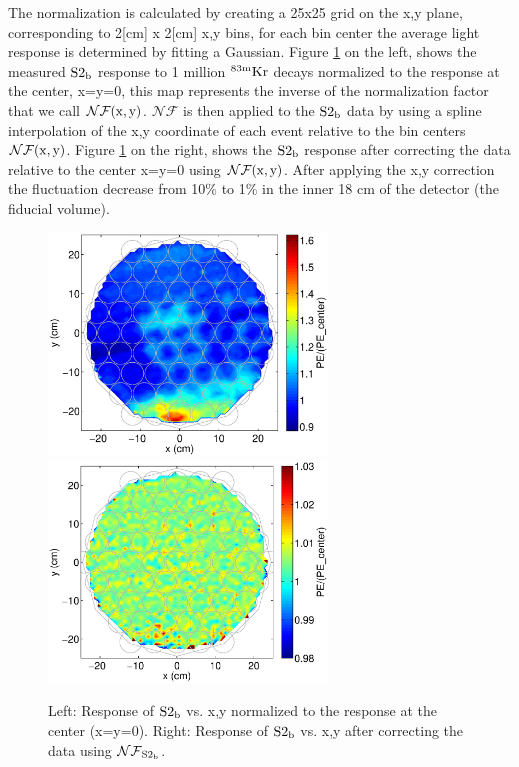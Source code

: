 The normalization is calculated by creating a 25x25 grid on the x,y plane, corresponding to 2[cm] x 2[cm] x,y bins, for each bin center the average light response is determined by fitting a Gaussian. Figure \ref{fig:S2_XY_norm_center} on the left, shows the measured $\rm S2_b$ response to 1 million $\rm^{83m}Kr$ decays normalized to the response at the center, x=y=0, this map represents the inverse of the normalization factor that we call $\rm\mathcal{NF}(x,y)$. $\mathcal{NF}$ is then applied to the $\rm S2_b$ data by using a spline interpolation of the x,y coordinate of each event relative to the bin centers $\rm\mathcal{NF}(x,y)$. Figure \ref{fig:S2_XY_norm_center} on the right, shows the $\rm S2_b$ response after correcting the data relative to the center x=y=0 using $\rm\mathcal{NF}(x,y)$. After applying the x,y correction the fluctuation decrease from 10\% to 1\% in the inner 18 cm of the detector (the fiducial volume).


\begin{figure}[h!]\centering
\includegraphics[width=74mm]{Chapter_XYZ_Corr/Thesis_Corr_Plots/S2_b_1cm_1cm/S2_b_XY_1cm_norm.eps}
\includegraphics[width=74mm]{Chapter_XYZ_Corr/Thesis_Corr_Plots/S2_b_1cm_1cm/S2_b_XY_1cm_norm_FlatField.eps}
\caption{Left: Response of $\rm S2_b$ vs. x,y normalized to the response at the center (x=y=0). Right: Response of $\rm S2_b$ vs. x,y after correcting the data using $\rm\mathcal{NF}_{S2_b}$. }
\label{fig:S2_XY_norm_center}
\end{figure}


